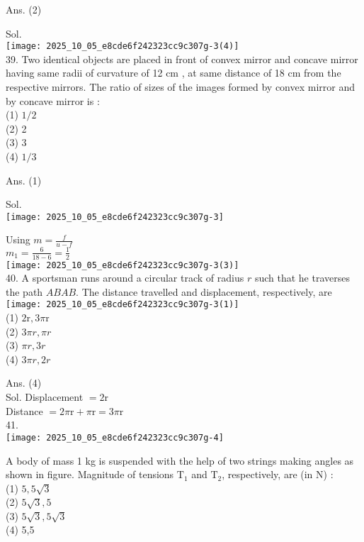 \documentclass[10pt]{article}
\begin{document}
Ans. (2)

Sol.\\
\texttt{[image: 2025\_10\_05\_e8cde6f242323cc9c307g-3(4)]}\\
39. Two identical objects are placed in front of convex mirror and concave mirror having same radii of curvature of 12 cm , at same distance of 18 cm from the respective mirrors. The ratio of sizes of the images formed by convex mirror and by concave mirror is :\\
(1) \(1 / 2\)\\
(2) 2\\
(3) 3\\
(4) \(1 / 3\)

Ans. (1)

Sol.\\
\texttt{[image: 2025\_10\_05\_e8cde6f242323cc9c307g-3]}

Using \(m=\frac{f}{u-f}\)\\
\(m_{1}=\frac{6}{18-6}=\frac{1}{2}\)\\
\texttt{[image: 2025\_10\_05\_e8cde6f242323cc9c307g-3(3)]}\\
40. A sportsman runs around a circular track of radius \(r\) such that he traverses the path \(A B A B\). The distance travelled and displacement, respectively, are\\
\texttt{[image: 2025\_10\_05\_e8cde6f242323cc9c307g-3(1)]}\\
(1) \(2 \mathrm{r}, 3 \pi \mathrm{r}\)\\
(2) \(3 \pi r, \pi r\)\\
(3) \(\pi r, 3 r\)\\
(4) \(3 \pi r, 2 r\)

Ans. (4)\\
Sol. Displacement \(=2 \mathrm{r}\)\\
Distance \(=2 \pi \mathrm{r}+\pi \mathrm{r}=3 \pi \mathrm{r}\)\\
41.\\
\texttt{[image: 2025\_10\_05\_e8cde6f242323cc9c307g-4]}

A body of mass 1 kg is suspended with the help of two strings making angles as shown in figure. Magnitude of tensions \(\mathrm{T}_{1}\) and \(\mathrm{T}_{2}\), respectively, are (in N) :\\
(1) \(5,5 \sqrt{3}\)\\
(2) \(5 \sqrt{3}, 5\)\\
(3) \(5 \sqrt{3}, 5 \sqrt{3}\)\\
(4) 5,5
\end{document}
